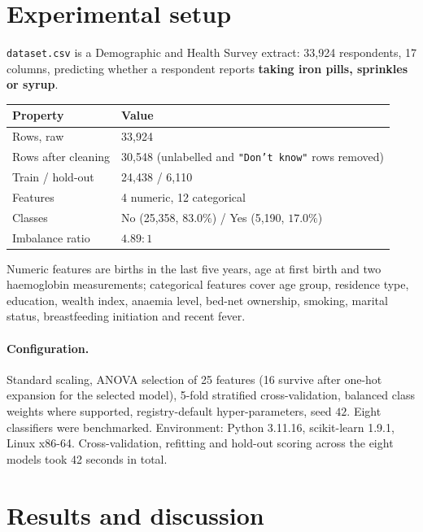 \documentclass[11pt,a4paper]{article}
\begin{document}
\section{Experimental setup}

\texttt{dataset.csv} is a Demographic and Health Survey extract: 33{,}924
respondents, 17 columns, predicting whether a respondent reports \textbf{taking
iron pills, sprinkles or syrup}.

\begin{center}
\begin{tabularx}{\textwidth}{L{5.2cm} X}
\toprule
\textbf{Property} & \textbf{Value} \\
\midrule
Rows, raw & 33{,}924 \\
Rows after cleaning & 30{,}548 (unlabelled and \texttt{"Don't know"} rows removed) \\
Train / hold-out & 24{,}438 / 6{,}110 \\
Features & 4 numeric, 12 categorical \\
Classes & No (25{,}358, $83.0\%$) / Yes (5{,}190, $17.0\%$) \\
Imbalance ratio & $4.89 : 1$ \\
\bottomrule
\end{tabularx}
\end{center}

Numeric features are births in the last five years, age at first birth and two
haemoglobin measurements; categorical features cover age group, residence type,
education, wealth index, anaemia level, bed-net ownership, smoking, marital
status, breastfeeding initiation and recent fever.

\paragraph{Configuration.} Standard scaling, ANOVA selection of 25 features (16
survive after one-hot expansion for the selected model), 5-fold stratified
cross-validation, balanced class weights where supported, registry-default
hyper-parameters, seed $42$. Eight classifiers were benchmarked. Environment:
Python 3.11.16, scikit-learn 1.9.1, Linux x86-64. Cross-validation, refitting
and hold-out scoring across the eight models took 42 seconds in total.

\section{Results and discussion}
\end{document}
